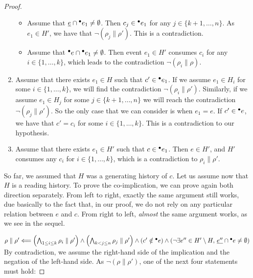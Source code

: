 \documentclass[12pt,a4paper]{article}
\begin{document}
\begin{proof}
\begin{enumerate}[$i$.]
\begin{itemize}
\item Assume that $\underline{e} \cap {}^\bullet e_1 \ne \emptyset$.  Then $c_j \in
{}^\bullet e_1$ for any $j \in \{k+1, \ldots, n\}$.  As $e_1 \in H'$, we have that
$\lnot (\rho_j \parallel \rho')$.  This is a contradiction.

\item Assume that ${}^\bullet e \cap {}^\bullet e_1 \ne \emptyset$.  Then event $e_1 \in
H'$ consumes $c_i$ for any $i \in \{1, \ldots, k\}$, which leads to the
contradiction $\lnot (\rho_i \parallel \rho)$.
\end{itemize}

\item Assume that there exists $e_1 \in H$ such that $c' \in {}^\bullet e_1$.  If we
assume $e_1 \in H_i$ for some $i \in \{1, \ldots, k\}$, we will find the
contradiction $\lnot (\rho_i \parallel \rho')$.  Similarly, if we assume $e_1
\in H_j$ for some $j \in \{k+1, \ldots, n\}$ we will reach the
contradiction $\lnot (\rho_j \parallel \rho')$.  So the only case that we
can consider is when $e_1 = e$.  If $c' \in {}^\bullet e$, we have that $c' = c_i$
for some $i \in \{1, \ldots, k\}$.  This is a contradiction to our hypothesis.

\item Assume that there exists $e_1 \in H'$ such that $c \in {}^\bullet e_1$.  Then
$e \in H'$, and $H'$ consumes any $c_i$ for $i \in \{1, \ldots, k\}$, which is
a contradiction to $\rho_i \parallel \rho'$.
\end{enumerate}

So far, we assumed that $H$ was a generating history of $c$.  Let us assume now
that $H$ is a reading history.  To prove the co-implication, we can prove again
both direction separately.  From left to right, exactly the same argument still
works, due basically to the fact that, in our proof, we do not rely on any
particular relation between $e$ and $c$.  From right to left, \emph{almost} the
same argument works, as we see in the sequel.

\item $\rho \parallel \rho' \Longleftarrow
\left ( \bigwedge_{1 \le i \le k} \rho_i \parallel \rho' \right ) \land 
\left ( \bigwedge_{k < j \le n} \rho_j \parallel \rho' \right ) \land 
\left ( c' \notin {}^\bullet e \right ) \land
\left ( \lnot \exists e'' \in H' \setminus H,\, \underline{e''} \cap {}^\bullet e \ne
\emptyset \right )$ By contradiction, we assume the right-hand side of the
implication and the negation of the left-hand side.  As $\lnot (\rho \parallel
\rho')$, one of the next four statements must hold:


\end{proof}
\end{document}
